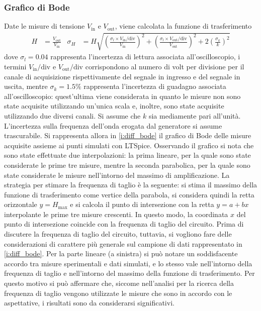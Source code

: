 \documentclass[a4paper,11pt]{article} %
\begin{document}
\subsubsection{Grafico di Bode}
Date le misure di tensione $V_{\text{in}}$ e $V_{\text{out}}$, viene calcolata la funzione di trasferimento
\begin{align}\label{e:diff_err}
	H&=\frac{V_{\text{out}}}{V_{\text{in}}} & \sigma_{H}&= H \sqrt{	
											\left(	\frac{	\sigma_{l}\times V_{\text{in}}/\text{div}	}{	V_{\text{in}}	}	\right)^2	 + 
											\left(	\frac{	\sigma_{l}\times V_{\text{out}}/\text{div}	}{	V_{\text{out}}	}	\right)^2 +	
											2\left(	\frac{	\sigma_{k}	}{	k	}	\right)^2 }	
\end{align}
\noindent dove $\sigma_{l}=0.04$ rappresenta l'incertezza di lettura associata all'oscilloscopio, i termini
$V_{\text{in}}/\text{div}$ e $V_{\text{out}}/\text{div}$ corrispondono al numero di volt per divisione per il canale di
acquisizione rispettivamente del segnale in ingresso e del segnale in uscita, mentre $\sigma_{k}=1.5\%$ rappresenta
l'incertezza di guadagno associata all'oscilloscopio: quest'ultima viene considerata in quanto le misure non sono state
acquisite utilizzando un'unica scala e, inoltre, sono state acquisite utilizzando due diversi canali. Si assume che $k$
sia mediamente pari all'unità. L'incertezza sulla frequenza dell'onda erogata dal generatore si assume trascurabile. Si
rappresenta allora in \autoref{i:diff_bode} il grafico di Bode delle misure acquisite assieme ai punti simulati con
LTSpice. Osservando il grafico si nota che sono state effettuate due interpolazioni: la prima lineare, per la quale sono
state considerate le prime tre misure, mentre la seconda parabolica, per la quale sono state considerate le misure
nell'intorno del massimo di amplificazione. La strategia per stimare la frequenza di taglio è la seguente: si stima il
massimo della funzione di trasferimento come vertice della parabola, si considera quindi la retta orizzontale
$y=H_{\text{max}}$ e si calcola il punto di intersezione con la retta $y=a+bx$ interpolante le prime tre misure
crescenti. In questo modo, la coordinata $x$ del punto di intersezione coincide con la frequenza di taglio del circuito.
Prima di discutere la frequenza di taglio del circuito, tuttavia, si vogliono fare delle considerazioni di carattere più
generale sul campione di dati rappresentato in \autoref{i:diff_bode}. Per la parte lineare (a sinistra) si può notare un
soddisfacente accordo tra misure sperimentali e dati simulati, e lo stesso vale nell'intorno della frequenza di taglio e
nell'intorno del massimo della funzione di trasferimento. Per questo motivo si può affermare che, siccome nell'analisi
per la ricerca della frequenza di taglio vengono utilizzate le misure che sono in accordo con le aspettative, i
risultati sono da considerarsi significativi.  
\end{document}
